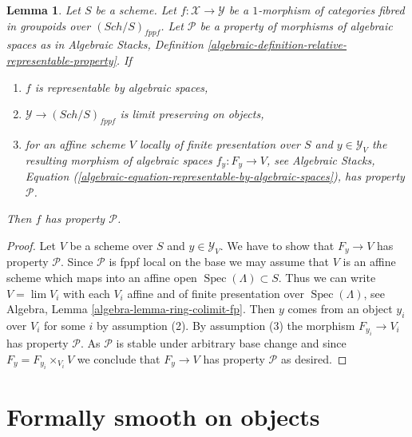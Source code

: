 \documentclass{stacks-project}
\theoremstyle{plain}
\newtheorem{lemma}[subsection]{Lemma}
\theoremstyle{definition}
\theoremstyle{remark}
\numberwithin{equation}{subsection}
\def\lim{\mathop{\mathrm{lim}}\nolimits}
\def\Spec{\mathop{\mathrm{Spec}}}
\def\Sch{\mathit{Sch}}
\begin{document}
\begin{lemma}
\label{lemma-check-property-limit-preserving}
Let $S$ be a scheme. Let $f : \mathcal{X} \to \mathcal{Y}$ be a $1$-morphism
of categories fibred in groupoids over $(\Sch/S)_{fppf}$. Let $\mathcal{P}$
be a property of morphisms of algebraic spaces as in
Algebraic Stacks, Definition
\ref{algebraic-definition-relative-representable-property}. If
\begin{enumerate}
\item $f$ is representable by algebraic spaces,
\item $\mathcal{Y} \to (\Sch/S)_{fppf}$ is limit preserving on objects,
\item for an affine scheme $V$ locally of finite presentation over $S$ and
$y \in \mathcal{Y}_V$ the resulting morphism of algebraic spaces
$f_y : F_y \to V$, see Algebraic Stacks, Equation
(\ref{algebraic-equation-representable-by-algebraic-spaces}),
has property $\mathcal{P}$.
\end{enumerate}
Then $f$ has property $\mathcal{P}$.
\end{lemma}

\begin{proof}
Let $V$ be a scheme over $S$ and $y \in \mathcal{Y}_V$. We have to show
that $F_y \to V$ has property $\mathcal{P}$. Since $\mathcal{P}$ is
fppf local on the base we may assume that $V$ is an affine scheme which
maps into an affine open $\Spec(\Lambda) \subset S$. Thus we can write
$V = \lim V_i$ with each $V_i$ affine and of finite presentation over
$\Spec(\Lambda)$, see Algebra, Lemma \ref{algebra-lemma-ring-colimit-fp}.
Then $y$ comes from an object $y_i$ over $V_i$ for some $i$ by assumption (2).
By assumption (3) the morphism $F_{y_i} \to V_i$ has property $\mathcal{P}$.
As $\mathcal{P}$ is stable under arbitrary base change and since
$F_y = F_{y_i} \times_{V_i} V$ we conclude that $F_y \to V$ has property
$\mathcal{P}$ as desired.
\end{proof}



\section{Formally smooth on objects}
\label{section-formally-smooth}
\end{document}
